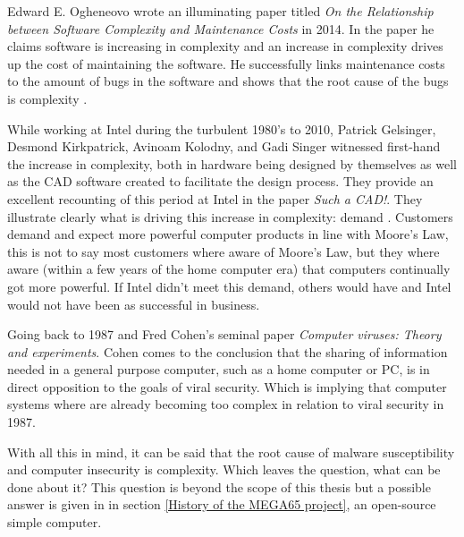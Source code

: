 Edward E. Ogheneovo wrote an illuminating paper titled \textit{On the Relationship between Software
Complexity and Maintenance Costs} in 2014. In the paper he claims software is increasing in complexity and an increase in complexity drives up the cost of maintaining the software. He successfully links  maintenance costs to the amount of bugs in the software and shows that the root cause of the bugs is complexity \cite{RN81}. 

While working at Intel during the turbulent 1980's to 2010, Patrick Gelsinger, Desmond Kirkpatrick,
Avinoam Kolodny, and Gadi Singer witnessed first-hand the increase in complexity, both in hardware being designed by themselves as well as the CAD software created to facilitate the design process. They provide an excellent recounting of this period at Intel in the paper \textit{Such a CAD!}. They illustrate clearly what is driving this increase in complexity: demand \cite{RN18}. Customers demand and expect more powerful computer products in line with Moore's Law, this is not to say most customers where aware of Moore's Law, but they where aware (within a few years of the home computer era) that computers continually got more powerful. If Intel didn't meet this demand, others would have and Intel would not have been as successful in business.

Going back to 1987 and Fred Cohen's seminal paper \textit{Computer viruses: Theory and experiments}. Cohen comes to the conclusion that the sharing of information needed in a general purpose computer, such as a home computer or PC, is in direct opposition to the goals of viral security. Which is implying that computer systems where are already becoming too complex in relation to viral security in 1987.

With all this in mind, it can be said that the root cause of malware susceptibility and computer insecurity is complexity. Which leaves the question, what can be done about it? This question is beyond the scope of this thesis but a possible answer is given in in section \ref{History of the MEGA65 project}, an open-source simple computer.